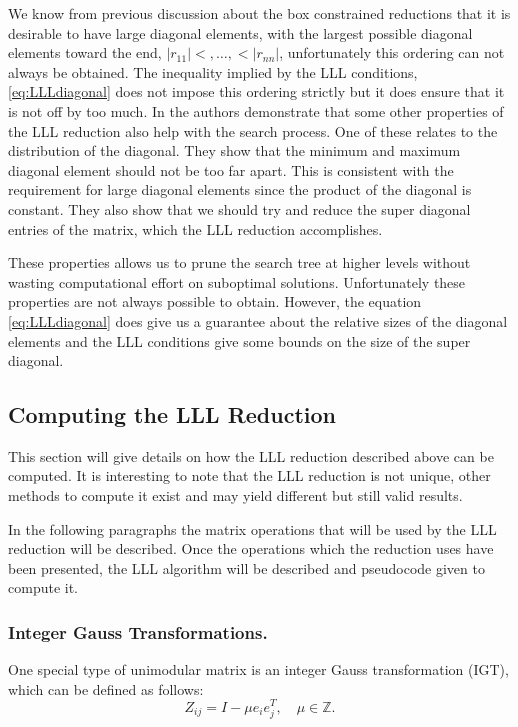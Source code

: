 \documentclass[12pt,Bold,letterpaper]{mcgilletdclass}
\newcommand{\vsp}{\vspace{\baselineskip}}
\begin{document}
We know from previous discussion
about the box constrained reductions that it is desirable to have large diagonal
elements, with the largest possible diagonal elements toward the end, $|r_{11}|
<, \dots,< |r_{nn}|$, unfortunately this ordering can not always be obtained. The inequality implied by the LLL conditions, \eqref{eq:LLLdiagonal} does not impose this ordering strictly but it does ensure that it is not off by too much. In \cite{XieCB11} the authors demonstrate that some other properties of the LLL reduction also help with the search process. One of these relates to the distribution of the diagonal. They show that the minimum and maximum diagonal element should not be too far apart. This is consistent with the requirement for large diagonal elements since the product of the diagonal is constant. They also show that we should try and reduce the super diagonal entries of the matrix, which the LLL reduction accomplishes. 

These properties allows us to prune the search
tree at higher levels without wasting computational effort on suboptimal
solutions. Unfortunately these properties are not always possible to obtain.
However, the equation \eqref{eq:LLLdiagonal} does give us a guarantee about the
relative sizes of the diagonal elements and the LLL conditions give some bounds
on the size of the super diagonal.

\vsp \subsection{Computing the LLL Reduction}

This section will give details on how the LLL reduction described above can be
computed. It is interesting to note that the LLL reduction is not unique, other
methods to compute it exist and may yield different but still valid results.

In the following paragraphs the matrix operations that will be used by the LLL
reduction will be described. Once the operations which the reduction uses have
been presented, the LLL algorithm will be described and pseudocode given to
compute it.

\vsp \subsubsection{Integer Gauss Transformations.} \label{subsec:IGT}

One special type of unimodular matrix is an integer Gauss transformation (IGT), which can be defined as follows:
\begin{equation}
Z_{ij} = I-\mu e_ie_j^T, \quad \mu \in \mathbb{Z}.
\end{equation}
\end{document}
